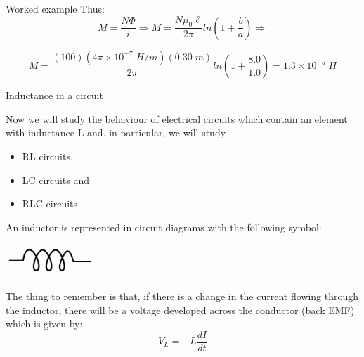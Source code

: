 {\begin{frame}{Worked example}
Thus:
\begin{equation*}
  M = \frac{N\Phi}{i} \Rightarrow M = \frac{N \mu_0 \ell}{2\pi}
  ln(1 + \frac{b}{a}) \Rightarrow
\end{equation*}

\begin{equation*}
  M = \frac{(100) (4\pi \times 10^{-7} \; H/m) (0.30 \; m)}{2\pi}
  ln(1 + \frac{8.0}{1.0}) = 1.3 \times 10^{-5} \; H
\end{equation*}

\end{frame}


} %


%
%
%

\begin{frame}{Inductance in a circuit}

Now we will study the behaviour of electrical circuits which contain an element with inductance L
and, in particular, we will study
\begin{itemize}
  \item RL circuits,
  \item LC circuits and
  \item RLC circuits
\end{itemize}

\vspace{0.3cm}

An inductor is represented in circuit diagrams with the following symbol:
\begin{center}
  \includegraphics[width=0.25\textwidth]{./images/schematics/inductance_circuit_symbol.png}\\
\end{center}

\vspace{0.3cm}

The thing to remember is that, if there is a change in the current flowing through the inductor,
there will be a voltage developed across the conductor (back EMF) which is given by:
\begin{equation*}
    V_{L} =  -L \frac{dI}{dt}
\end{equation*}

\end{frame}

